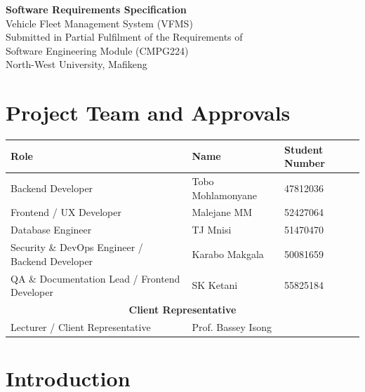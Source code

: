 \documentclass[11pt,a4paper]{article}
\begin{document}
\begin{titlepage}
\centering
\vspace*{2cm}
{\LARGE\bfseries Software Requirements Specification}\\[0.5cm]
{\Large Vehicle Fleet Management System (VFMS)}\\[2cm]

\vspace{2cm}
Submitted in Partial Fulfilment of the Requirements of\\
Software Engineering Module (CMPG224)\\
North-West University, Mafikeng
\end{titlepage}

\section*{Project Team and Approvals}

\begin{table}[H]
\centering
\begin{tabularx}{\textwidth}{|X|X|X|}
\hline
\textbf{Role} & \textbf{Name} & \textbf{Student Number} \\
\hline
Backend Developer & Tobo Mohlamonyane & 47812036 \\
\hline
Frontend / UX Developer & Malejane MM & 52427064 \\
\hline
Database Engineer & TJ Mnisi & 51470470 \\
\hline
Security \& DevOps Engineer / Backend Developer & Karabo Makgala & 50081659 \\
\hline
QA \& Documentation Lead / Frontend Developer & SK Ketani & 55825184 \\
\hline
\multicolumn{3}{|c|}{\textbf{Client Representative}} \\
\hline
Lecturer / Client Representative & Prof. Bassey Isong &  \\
\hline
\end{tabularx}
\end{table}

\clearpage

\tableofcontents
\newpage

\section{Introduction}
\end{document}
